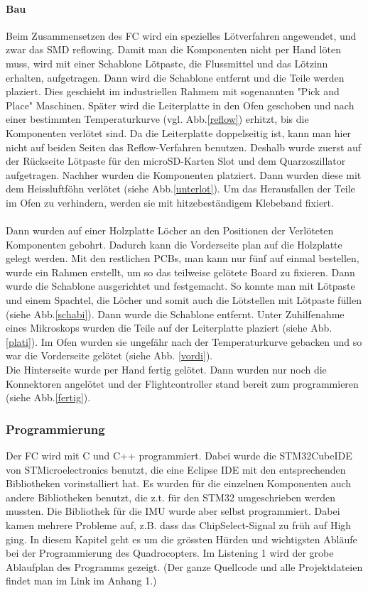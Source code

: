 \documentclass[12pt,a4paper, ngerman]{article}
\begin{document}
\paragraph{Bau}
Beim Zusammensetzen des FC wird ein spezielles Lötverfahren angewendet, und zwar das SMD reflowing. Damit man die Komponenten nicht per Hand löten muss, wird mit einer Schablone Lötpaste, die Flussmittel und das Lötzinn erhalten, aufgetragen. Dann wird die Schablone entfernt und die Teile werden plaziert. Dies geschieht im industriellen Rahmem mit sogenannten "Pick and Place" Maschinen. Später wird die Leiterplatte in den Ofen geschoben und nach einer bestimmten Temperaturkurve (vgl. Abb.\ref{reflow}) erhitzt, bis die Komponenten verlötet sind\cite{website:sauter-elektronik.de_reflow}.
Da die Leiterplatte doppelseitig ist, kann man hier nicht auf beiden Seiten das Reflow-Verfahren benutzen. Deshalb wurde zuerst auf der Rückseite Lötpaste für den microSD-Karten Slot und dem Quarzoszillator aufgetragen. Nachher wurden die Komponenten platziert. Dann wurden diese mit dem Heissluftföhn verlötet (siehe Abb.\ref{unterlot}). Um das Herausfallen der Teile im Ofen zu verhindern, werden sie mit hitzebeständigem Klebeband fixiert. \\ \\
Dann wurden auf einer Holzplatte Löcher an den Positionen der Verlöteten Komponenten gebohrt. Dadurch kann die Vorderseite plan auf die Holzplatte gelegt werden. Mit den restlichen PCBs, man kann nur fünf auf einmal bestellen, wurde ein Rahmen erstellt, um so das teilweise gelötete Board zu fixieren. Dann wurde die Schablone ausgerichtet und festgemacht. So konnte man mit Lötpaste und einem Spachtel, die Löcher und somit auch die Lötstellen mit Lötpaste füllen (siehe Abb.\ref{schabi}). 
Dann wurde die Schablone entfernt. Unter Zuhilfenahme eines Mikroskops wurden die Teile auf der Leiterplatte plaziert (siehe Abb.\ref{plati}). 
\noindent
Im Ofen wurden sie ungefähr nach der Temperaturkurve gebacken und so war die Vorderseite gelötet (siehe Abb. \ref{vordi}). \\
Die Hinterseite wurde per Hand fertig gelötet. Dann wurden nur noch die Konnektoren angelötet und der Flightcontroller stand bereit zum programmieren (siehe Abb.\ref{fertig}).
\newpage
\subsubsection{Programmierung}
Der FC wird mit C und C++ programmiert. Dabei wurde die STM32CubeIDE von STMicroelectronics benutzt, die eine Eclipse IDE mit den entsprechenden Bibliotheken vorinstalliert hat. Es wurden für die einzelnen Komponenten auch andere Bibliotheken benutzt, die z.t. für den STM32 umgeschrieben werden mussten. Die Bibliothek für die IMU wurde aber selbst programmiert. Dabei kamen mehrere Probleme auf, z.B. dass das ChipSelect-Signal zu früh auf High ging. In diesem Kapitel geht es um die grössten Hürden und wichtigsten Abläufe bei der Programmierung des Quadrocopters. Im Listening 1 wird der grobe Ablaufplan des Programms gezeigt. (Der ganze Quellcode und alle Projektdateien findet man im Link im Anhang 1.)
\end{document}
